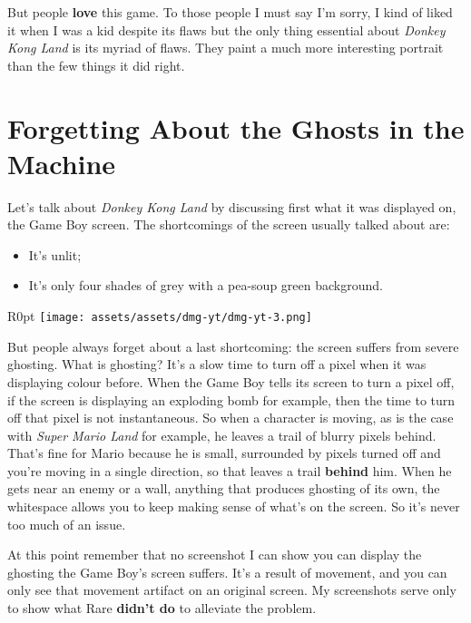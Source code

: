 \documentclass{book}
\begin{document}
But people \textbf{love} this game. To those people I must say I’m sorry, I kind of liked it when I was a kid despite its flaws but the only thing essential about \emph{Donkey Kong Land} is its myriad of flaws. They paint a much more interesting portrait than the few things it did right.

\FloatBarrier\needspace{10mm}\section*{Forgetting About the Ghosts in the Machine}\nopagebreak[4]

Let’s talk about \emph{Donkey Kong Land} by discussing first what it was displayed on, the Game Boy screen. The shortcomings of the screen usually talked about are:

\begin{itemize} [nosep]
\item It’s unlit;
\item It’s only four shades of grey with a pea-soup green background.
\end{itemize}\noindent

\begin{wrapfigure}{R}{0pt} \texttt{[image: assets/assets/dmg-yt/dmg-yt-3.png]}\end{wrapfigure}
But people always forget about a last shortcoming: the screen suffers from severe ghosting. What is ghosting? It’s a slow time to turn off a pixel when it was displaying colour before. When the Game Boy tells its screen to turn a pixel off, if the screen is displaying an exploding bomb for example, then the time to turn off that pixel is not instantaneous. So when a character is moving, as is the case with \emph{Super Mario Land} for example, he leaves a trail of blurry pixels behind. That’s fine for Mario because he is small, surrounded by pixels turned off and you’re moving in a single direction, so that leaves a trail \textbf{behind} him. When he gets near an enemy or a wall, anything that produces ghosting of its own, the whitespace allows you to keep making sense of what’s on the screen. So it’s never too much of an issue.

At this point remember that no screenshot I can show you can display the ghosting the Game Boy’s screen suffers. It’s a result of movement, and you can only see that movement artifact on an original screen. My screenshots serve only to show what Rare \textbf{didn’t do} to alleviate the problem.
\end{document}
